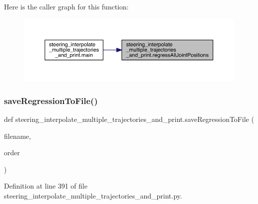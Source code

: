 Here is the caller graph for this function\+:\nopagebreak
\begin{figure}[H]
\begin{center}
\leavevmode
\includegraphics[width=350pt]{namespacesteering__interpolate__multiple__trajectories__and__print_a455bf7b19b802ee191ffab2ea68b89ff_icgraph}
\end{center}
\end{figure}
\mbox{\label{namespacesteering__interpolate__multiple__trajectories__and__print_abd864bec2616f889e72f950898521b8b}} 
\subsubsection{\texorpdfstring{saveRegressionToFile()}{saveRegressionToFile()}}
{\footnotesize\ttfamily def steering\+\_\+interpolate\+\_\+multiple\+\_\+trajectories\+\_\+and\+\_\+print.\+save\+Regression\+To\+File (\begin{DoxyParamCaption}\item[{}]{filename,  }\item[{}]{order }\end{DoxyParamCaption})}



Definition at line 391 of file steering\+\_\+interpolate\+\_\+multiple\+\_\+trajectories\+\_\+and\+\_\+print.\+py.


